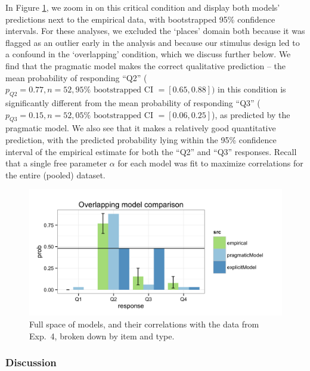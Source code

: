 \documentclass[12pt, floatsintext, jou]{apa6}
\begin{document}
In Figure \ref{fig:Exp4ZoomedIn}, we zoom in on this critical condition and display both models' predictions next to the empirical data, with bootstrapped 95\% confidence intervals. For these analyses, we excluded the `places' domain both because it was flagged as an outlier early in the analysis and because our stimulus design led to a confound in the `overlapping' condition, which we discuss further below. We find that the pragmatic model makes the correct qualitative prediction -- the mean probability of responding ``Q2'' ($p_{Q2} = 0.77, n = 52, 95\%\textrm{ bootstrapped CI }= [0.65, 0.88])$ in this condition is significantly different from the mean probability of responding ``Q3'' ($p_{Q3} = 0.15, n = 52, 05\% \textrm{ bootstrapped CI }=[0.06, 0.25]$), as predicted by the pragmatic model. We also see that it makes a relatively good quantitative prediction, with the predicted probability lying within the 95\% confidence interval of the empirical estimate for both the ``Q2'' and ``Q3'' responses. Recall that a single free parameter $\alpha$ for each model was fit to maximize correlations for the entire (pooled) dataset.

%
\begin{figure}[t!]
\begin{center}
\includegraphics[scale=.25]{OverlappingModelComparison.png}
\end{center}
\vspace{-.5cm}
\caption{Full space of models, and their correlations with the data from Exp.~4, broken down by item and type.}
\label{fig:Exp4ZoomedIn}
\vspace{-.15cm}
\end{figure}
%


\subsubsection{Discussion}
\end{document}
